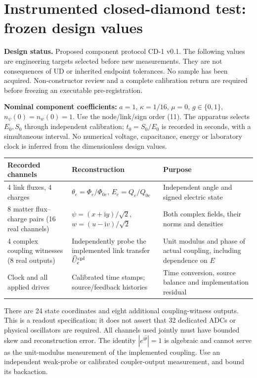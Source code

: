 \documentclass[10pt,a4paper]{article}
\newcommand{\ii}{\mathrm i}
\begin{document}
\newpage
\appendix
\section{Instrumented closed-diamond test: frozen design values}
\textbf{Design status.} Proposed component protocol CD-1 v0.1. The following values are engineering targets selected before new measurements. They are not consequences of UD or inherited endpoint tolerances. No sample has been acquired. Non-constructor review and a complete calibration return are required before freezing an executable pre-registration.

\textbf{Nominal component coefficients:}
$a=1$, $\kappa=1/16$, $\mu=0$, $g\in\{0,1\}$, $n_\psi(0)=n_w(0)=1$. Use the node/link/sign order (11). The apparatus selects $E_0,S_0$ through independent calibration; $t_0=S_0/E_0$ is recorded in seconds, with a simultaneous interval. No numerical voltage, capacitance, energy or laboratory clock is inferred from the dimensionless design values.

\begin{center}\small
\begin{tabular}{p{.16\linewidth}p{.36\linewidth}p{.38\linewidth}}
\toprule
Recorded channels & Reconstruction & Purpose\\\midrule
4 link fluxes, 4 charges & $\theta_e=\Phi_e/\Phi_{0e}$, $E_e=Q_e/Q_{0e}$ & Independent angle and signed electric state\\
8 matter flux--charge pairs (16 real channels) & $\psi=(x+\ii y)/\sqrt2$, $w=(u-\ii v)/\sqrt2$ & Both complex fields, their norms and densities\\
4 complex coupling witnesses (8 real outputs) & Independently probe the implemented link transfer $\widehat U_e^{\rm cpl}$ & Unit modulus and phase of actual coupling, including dependence on $E$\\
Clock and all applied drives & Calibrated time stamps; source/feedback histories & Time conversion, source balance and implementation residual\\
\bottomrule
\end{tabular}
\end{center}
There are 24 state coordinates and eight additional coupling-witness outputs. This is a readout specification; it does not assert that 32 dedicated ADCs or physical oscillators are required. All channels used jointly must have bounded skew and reconstruction error. The identity $|e^{\ii\widehat\theta}|=1$ is algebraic and cannot serve as the unit-modulus measurement of the implemented coupling. Use an independent weak-probe or calibrated coupler-output measurement, and bound its backaction.
\end{document}
